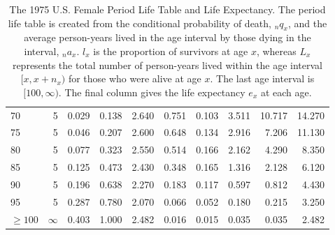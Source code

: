 \documentclass[11pt,letterpaper]{article}
\theoremstyle{plain}
\begin{document}
\begin{table}[htbp]
\begin{tabular}{lrrrrrrrrr}
  70 & 5 & 0.029 & 0.138 & 2.640 & 0.751 & 0.103 & 3.511 & 10.717 & 14.270 \\ 
  75 & 5 & 0.046 & 0.207 & 2.600 & 0.648 & 0.134 & 2.916 & 7.206 & 11.130 \\ 
  80 & 5 & 0.077 & 0.323 & 2.550 & 0.514 & 0.166 & 2.162 & 4.290 & 8.350 \\ 
  85 & 5 & 0.125 & 0.473 & 2.430 & 0.348 & 0.165 & 1.316 & 2.128 & 6.120 \\ 
  90 & 5 & 0.196 & 0.638 & 2.270 & 0.183 & 0.117 & 0.597 & 0.812 & 4.430 \\ 
  95 & 5 & 0.287 & 0.780 & 2.070 & 0.066 & 0.052 & 0.180 & 0.215 & 3.250 \\ 
  $\geq100$ & $\infty$ & 0.403 & 1.000 & 2.482 & 0.016 & 0.015 & 0.035 & 0.035 & 2.482 \\ 
   \bottomrule
\end{tabular}
\caption{The 1975 U.S. Female Period Life Table and Life Expectancy.  
  The period life table is created from the conditional
  probability of death, $_nq_x$, and the average person-years lived
  in the age interval by those dying in the interval, $_na_x$.
  $l_x$ is the proportion of survivors at age $x$, whereas $L_x$
  represents the total number of person-years lived within the age
  interval $[x, x+n_x)$ for those who were alive at age $x$. The
  last age interval is $[100, \infty)$. The final column gives the
  life expectancy $e_x$ at each age.}
    \label{tb:lifetable}
\end{table}

\end{document}
